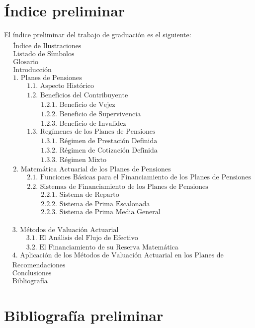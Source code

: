 \documentclass[12pt,letterpaper,titlepage]{article}
\begin{document}
\section{Índice preliminar}
El índice preliminar del trabajo de graduación es el siguiente:
\begin{align*}
&\text{Índice de Ilustraciones}\\
&\text{Listado de Símbolos}\\
&\text{Glosario}\\
&\text{Introducción}\\
&\text{1. Planes de Pensiones}\\
&\qquad\text{1.1. Aspecto Histórico }\\
&\qquad\text{1.2. Beneficios del Contribuyente }\\
&\qquad\qquad\text{1.2.1. Beneficio de Vejez}\\
&\qquad\qquad\text{1.2.2. Beneficio de Supervivencia}\\
&\qquad\qquad\text{1.2.3. Beneficio de Invalidez}\\
&\qquad\text{1.3. Regímenes de los Planes de Pensiones}\\
&\qquad\qquad\text{1.3.1. Régimen de Prestación Definida}\\
&\qquad\qquad\text{1.3.2. Régimen de Cotización Definida}\\
&\qquad\qquad\text{1.3.3. Régimen Mixto}\\
&\text{2. Matemática Actuarial de los Planes de Pensiones}\\
&\qquad\text{2.1. Funciones Básicas para el Financiamiento de los Planes de Pensiones}\\
&\qquad\text{2.2. Sistemas de Financiamiento de los Planes de Pensiones}\\
&\qquad\qquad\text{2.2.1. Sistema de Reparto}\\
&\qquad\qquad\text{2.2.2. Sistema de Prima Escalonada}\\
&\qquad\qquad\text{2.2.3. Sistema de Prima Media General}\\
\end{align*}

\newpage
\begin{align*}
&\text{3. Métodos de Valuación Actuarial}\\
&\qquad\text{3.1. El Análisis del Flujo de Efectivo}\\
&\qquad\text{3.2. El Financiamiento de su Reserva Matemática}\\
&\text{4. Aplicación de los Métodos de Valuación Actuarial en los Planes de Pensiones Ocupacionales}\\
&\text{Recomendaciones}\\
&\text{Conclusiones}\\
&\text{Bibliografía} 
\end{align*}

\newpage

\section{Bibliografía preliminar}


\label{fin}
\end{document}
